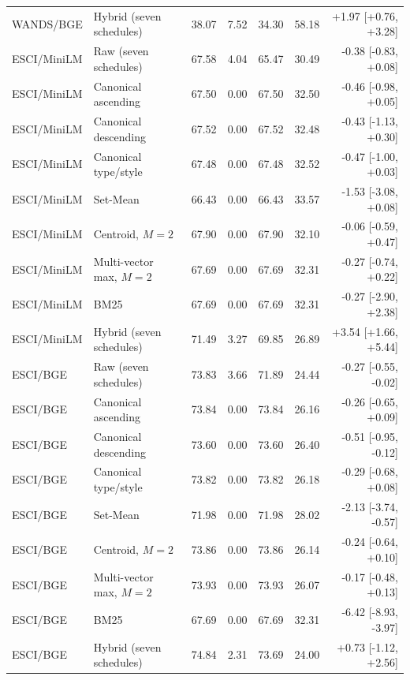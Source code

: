 \begin{table}[t]
\begin{tabular}{llrrrrr}
WANDS/BGE & Hybrid (seven schedules) & 38.07 & 7.52 & 34.30 & 58.18 & +1.97 [+0.76, +3.28] \\
ESCI/MiniLM & Raw (seven schedules) & 67.58 & 4.04 & 65.47 & 30.49 & -0.38 [-0.83, +0.08] \\
ESCI/MiniLM & Canonical ascending & 67.50 & 0.00 & 67.50 & 32.50 & -0.46 [-0.98, +0.05] \\
ESCI/MiniLM & Canonical descending & 67.52 & 0.00 & 67.52 & 32.48 & -0.43 [-1.13, +0.30] \\
ESCI/MiniLM & Canonical type/style & 67.48 & 0.00 & 67.48 & 32.52 & -0.47 [-1.00, +0.03] \\
ESCI/MiniLM & Set-Mean & 66.43 & 0.00 & 66.43 & 33.57 & -1.53 [-3.08, +0.08] \\
ESCI/MiniLM & Centroid, $M=2$ & 67.90 & 0.00 & 67.90 & 32.10 & -0.06 [-0.59, +0.47] \\
ESCI/MiniLM & Multi-vector max, $M=2$ & 67.69 & 0.00 & 67.69 & 32.31 & -0.27 [-0.74, +0.22] \\
ESCI/MiniLM & BM25 & 67.69 & 0.00 & 67.69 & 32.31 & -0.27 [-2.90, +2.38] \\
ESCI/MiniLM & Hybrid (seven schedules) & 71.49 & 3.27 & 69.85 & 26.89 & +3.54 [+1.66, +5.44] \\
ESCI/BGE & Raw (seven schedules) & 73.83 & 3.66 & 71.89 & 24.44 & -0.27 [-0.55, -0.02] \\
ESCI/BGE & Canonical ascending & 73.84 & 0.00 & 73.84 & 26.16 & -0.26 [-0.65, +0.09] \\
ESCI/BGE & Canonical descending & 73.60 & 0.00 & 73.60 & 26.40 & -0.51 [-0.95, -0.12] \\
ESCI/BGE & Canonical type/style & 73.82 & 0.00 & 73.82 & 26.18 & -0.29 [-0.68, +0.08] \\
ESCI/BGE & Set-Mean & 71.98 & 0.00 & 71.98 & 28.02 & -2.13 [-3.74, -0.57] \\
ESCI/BGE & Centroid, $M=2$ & 73.86 & 0.00 & 73.86 & 26.14 & -0.24 [-0.64, +0.10] \\
ESCI/BGE & Multi-vector max, $M=2$ & 73.93 & 0.00 & 73.93 & 26.07 & -0.17 [-0.48, +0.13] \\
ESCI/BGE & BM25 & 67.69 & 0.00 & 67.69 & 32.31 & -6.42 [-8.93, -3.97] \\
ESCI/BGE & Hybrid (seven schedules) & 74.84 & 2.31 & 73.69 & 24.00 & +0.73 [-1.12, +2.56] \\
\bottomrule
\end{tabular}
\end{table}
